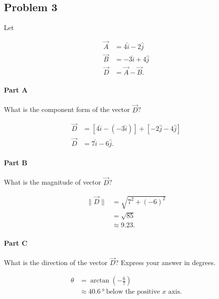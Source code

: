 
\newpage

\subsection{Problem 3}

Let

\begin{align*}
	\vec{A} &= 4\hat{i} - 2\hat{j} \\
	\vec{B} &= -3\hat{i} + 4\hat{j} \\
	\vec{D} &= \vec{A} - \vec{B}
	.\end{align*}

\setcounter{partcounter}{1}
\paragraph{Part A}

What is the component form of the vector $\vec{D}$?

\begin{solution}
	\begin{align*}
		\vec{D} &= \left[ 4\hat{i} - \left( -3\hat{i} \right) \right] + \left[ -2\hat{j} - 4\hat{j} \right] \\
		\vec{D} &= 7\hat{i} - 6\hat{j}
		.\end{align*}
\end{solution}

\setcounter{partcounter}{2}
\paragraph{Part B}

What is the magnitude of vector $\vec{D}$?

\begin{solution}
	\begin{align*}
		\lVert \vec{D} \rVert &= \sqrt{7^2 + \left( -6 \right)^2} \\
		&= \sqrt{85} \\
		&\approx 9.23
		.\end{align*}
\end{solution}

\setcounter{partcounter}{3}
\paragraph{Part C}

What is the direction of the vector $\vec{D}$? Express your answer in degrees.

\begin{solution}
	\begin{align*}
		\theta &= \arctan \left( -\frac{6}{7} \right) \\
		&\approx \SI{40.6}{\degree} ~ \text{below the positive $x$ axis}
		.\end{align*}
\end{solution}
